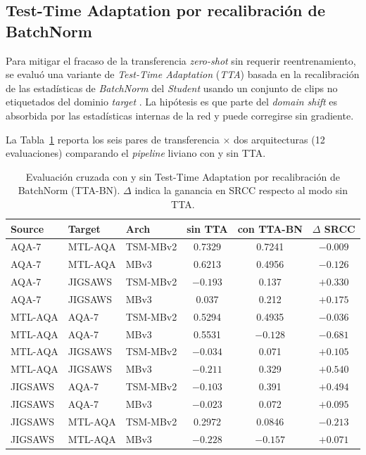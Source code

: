 \subsection{Test-Time Adaptation por recalibración de BatchNorm}
\label{sec:tta}

Para mitigar el fracaso de la transferencia \textit{zero-shot} sin requerir reentrenamiento, se evaluó una variante de \textit{Test-Time Adaptation} (\textit{TTA}) basada en la recalibración de las estadísticas de \textit{BatchNorm} del \textit{Student} usando un conjunto de clips no etiquetados del dominio \textit{target} \cite{Hinton2015Distilling}. La hipótesis es que parte del \textit{domain shift} es absorbida por las estadísticas internas de la red y puede corregirse sin gradiente.

La Tabla~\ref{tab:tta_crossdomain} reporta los seis pares de transferencia $\times$ dos arquitecturas (12 evaluaciones) comparando el \textit{pipeline} liviano con y sin TTA.

\begin{table}[H]
\centering
\caption{Evaluación cruzada con y sin Test-Time Adaptation por recalibración de BatchNorm (TTA-BN). $\Delta$ indica la ganancia en \ac{SRCC} respecto al modo sin TTA.}
\label{tab:tta_crossdomain}
\small
\begin{tabular}{lllccc}
\toprule
\textbf{Source} & \textbf{Target} & \textbf{Arch} & \textbf{sin TTA} & \textbf{con TTA-BN} & \textbf{$\Delta$ SRCC} \\
\midrule
AQA-7    & MTL-AQA & TSM-MBv2 &  0.7329 &  0.7241 & $-0.009$ \\
AQA-7    & MTL-AQA & MBv3     &  0.6213 &  0.4956 & $-0.126$ \\
AQA-7    & JIGSAWS & TSM-MBv2 & $-0.193$ &  0.137  & $+0.330$ \\
AQA-7    & JIGSAWS & MBv3     &  0.037  &  0.212  & $+0.175$ \\
\midrule
MTL-AQA  & AQA-7   & TSM-MBv2 &  0.5294 &  0.4935 & $-0.036$ \\
MTL-AQA  & AQA-7   & MBv3     &  0.5531 & $-0.128$ & $-0.681$ \\
MTL-AQA  & JIGSAWS & TSM-MBv2 & $-0.034$ &  0.071  & $+0.105$ \\
MTL-AQA  & JIGSAWS & MBv3     & $-0.211$ &  0.329  & $+0.540$ \\
\midrule
JIGSAWS  & AQA-7   & TSM-MBv2 & $-0.103$ &  0.391  & $+0.494$ \\
JIGSAWS  & AQA-7   & MBv3     & $-0.023$ &  0.072  & $+0.095$ \\
JIGSAWS  & MTL-AQA & TSM-MBv2 &  0.2972 &  0.0846 & $-0.213$ \\
JIGSAWS  & MTL-AQA & MBv3     & $-0.228$ & $-0.157$ & $+0.071$ \\
\bottomrule
\end{tabular}
\end{table}

